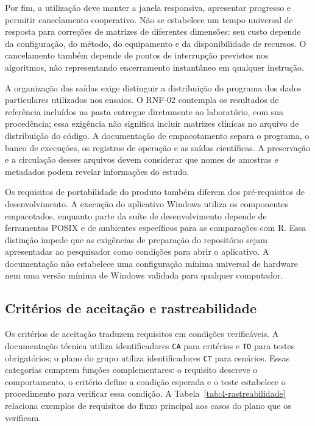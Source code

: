 Por fim, a utilização deve manter a janela responsiva, apresentar progresso e permitir cancelamento cooperativo. Não se estabelece um tempo universal de resposta para correções de matrizes de diferentes dimensões: seu custo depende da configuração, do método, do equipamento e da disponibilidade de recursos. O cancelamento também depende de pontos de interrupção previstos nos algoritmos, não representando encerramento instantâneo em qualquer instrução.

A organização das saídas exige distinguir a distribuição do programa dos dados particulares utilizados nos ensaios. O RNF-02 contempla os resultados de referência incluídos na pasta entregue diretamente ao laboratório, com sua procedência; essa exigência não significa incluir matrizes clínicas no arquivo de distribuição do código. A documentação de empacotamento separa o programa, o banco de execuções, os registros de operação e as saídas científicas. A preservação e a circulação desses arquivos devem considerar que nomes de amostras e metadados podem revelar informações do estudo.

Os requisitos de portabilidade do produto também diferem dos pré-requisitos de desenvolvimento. A execução do aplicativo Windows utiliza os componentes empacotados, enquanto parte da suíte de desenvolvimento depende de ferramentas POSIX e de ambientes específicos para as comparações com R. Essa distinção impede que as exigências de preparação do repositório sejam apresentadas ao pesquisador como condições para abrir o aplicativo. A documentação não estabelece uma configuração mínima universal de hardware nem uma versão mínima de Windows validada para qualquer computador.

\subsection{Critérios de aceitação e rastreabilidade}

Os critérios de aceitação traduzem requisitos em condições verificáveis. A documentação técnica utiliza identificadores \texttt{CA} para critérios e \texttt{TO} para testes obrigatórios; o plano do grupo utiliza identificadores \texttt{CT} para cenários. Essas categorias cumprem funções complementares: o requisito descreve o comportamento, o critério define a condição esperada e o teste estabelece o procedimento para verificar essa condição. A Tabela~\ref{tab:4-rastreabilidade} relaciona exemplos de requisitos do fluxo principal aos casos do plano que os verificam.

